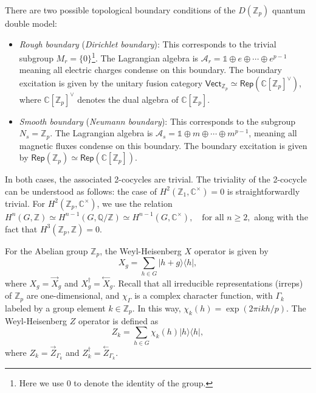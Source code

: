 \documentclass[a4paper,11pt]{article}
\theoremstyle{theorem}
\theoremstyle{remark}
\newcommand{\Zbb}{\mathbb{Z}}
\newcommand{\Cbb}{\mathbb{C}}
\newcommand{\Rep}{\mathsf{Rep}}
\newcommand{\XR}{\overset{\rightarrow}{X}}
\newcommand{\XL}{\overset{\leftarrow}{X}}
\newcommand{\ZR}{\overset{\rightarrow}{Z}}
\newcommand{\ZL}{\overset{\leftarrow}{Z}}
\newcommand{\Vect}{\mathsf{Vect}}
\begin{document}
There are two possible topological boundary conditions of the \(D(\mathbb{Z}_p)\) quantum double model:
\begin{itemize}
    \item \emph{Rough boundary} (\emph{Dirichlet boundary}): This corresponds to the trivial subgroup \(M_r = \{0\}\)\footnote{Here we use \(0\) to denote the identity of the group.}. 
The Lagrangian algebra is \(\mathcal{A}_r = \mathbb{1} \oplus e \oplus \cdots \oplus e^{p-1}\) meaning all electric charges condense on this boundary. The boundary excitation is given by the unitary fusion category \(\Vect_{\mathbb{Z}_p} \simeq \Rep(\Cbb[\Zbb_p]^{\vee})\), where $\Cbb[\Zbb_p]^{\vee}$ denotes the dual algebra of $\Cbb[\Zbb_p]$.
    \item \emph{Smooth boundary} (\emph{Neumann boundary}): This corresponds to the subgroup \(N_s = \mathbb{Z}_p\). The Lagrangian algebra is \(\mathcal{A}_s = \mathbb{1} \oplus m \oplus \cdots \oplus m^{p-1}\), meaning all magnetic fluxes condense on this boundary. The boundary excitation is given by \(\Rep(\mathbb{Z}_p)\simeq \Rep(\Cbb[\Zbb_p])\).
\end{itemize}
In both cases, the associated 2-cocycles are trivial. The triviality of the 2-cocycle can be understood as follows:  
the case of \( H^2(\mathbb{Z}_1, \mathbb{C}^\times) = 0 \) is straightforwardly trivial. For \( H^2(\mathbb{Z}_p, \mathbb{C}^\times) \), we use the relation  
\(
H^n(G, \mathbb{Z}) \simeq H^{n-1}(G, \mathbb{Q}/\mathbb{Z}) \simeq H^{n-1}(G, \mathbb{C}^\times), \quad \text{for all } n \geq 2,
\)  
along with the fact that \( H^3(\mathbb{Z}_p, \mathbb{Z}) = 0 \).  


For the Abelian group \(\mathbb{Z}_p\), the Weyl-Heisenberg \(X\) operator is given by
\[
X_g = \sum_{h \in G} |h+g\rangle \langle h|,
\]
where \(X_g = \XR_g\) and \(X_g^{\dagger} = \XL_g\). Recall that all irreducible representations (irreps) of \(\mathbb{Z}_p\) are one-dimensional, and \(\chi_{\Gamma}\) is a complex character function, with \(\Gamma_k\) labeled by a group element \(k \in \mathbb{Z}_p\). In this way, \(\chi_k(h) = \exp(2\pi i k h / p)\).  
The Weyl-Heisenberg \(Z\) operator is defined as  
\[
Z_k = \sum_{h \in G} \chi_k(h) |h\rangle \langle h|,
\]
where \(Z_k = \ZR_{\Gamma_k}\) and \(Z_k^{\dagger} = \ZL_{\Gamma_k}\).
\end{document}
